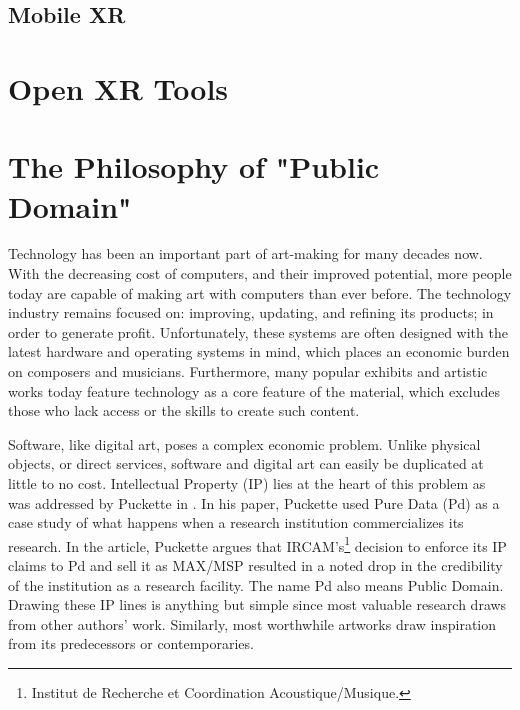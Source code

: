 


\subsection{Mobile XR}
\section{Open XR Tools }

\section{The Philosophy of "Public Domain"}

Technology has been an important part of art-making for many decades now. With the decreasing cost of computers, and their improved potential, more people today are capable of making art with computers than ever before. The technology industry remains focused on: improving, updating, and refining its products; in order to generate profit. Unfortunately, these systems are often designed with the latest hardware and operating systems in mind, which places an economic burden on composers and musicians. Furthermore, many popular exhibits and artistic works today feature technology as a core feature of the material, which excludes those who lack access or the skills to create such content.

Software, like digital art, poses a complex economic problem. Unlike physical objects, or direct services, software and digital art can easily be duplicated at little to no cost. Intellectual Property (IP) lies at the heart of this problem as was addressed by Puckette in \cite{puckette2004owns}. In his paper, Puckette used Pure Data (Pd) as a case study of what happens when a research institution commercializes its research. In the article, Puckette argues that IRCAM's\footnote{Institut de Recherche et Coordination Acoustique/Musique.} decision to enforce its IP claims to Pd and sell it as MAX/MSP resulted in a noted drop in the credibility of the institution as a research facility. The name Pd also means Public Domain. Drawing these IP lines is anything but simple since most valuable research draws from other authors' work. Similarly, most worthwhile artworks draw inspiration from its predecessors or contemporaries.

